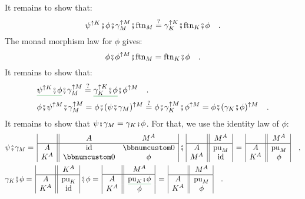 It remains to show that:
\[
\psi^{\uparrow K}\bef\phi\bef\gamma_{M}^{\uparrow M}\bef\text{ftn}_{M}\overset{?}{=}\gamma_{K}^{\uparrow K}\bef\text{ftn}_{K}\bef\phi\quad.
\]
The monad morphism law for $\phi$ gives:
\[
\phi\bef\phi^{\uparrow M}\bef\text{ftn}_{M}=\text{ftn}_{K}\bef\phi\quad.
\]
It remains to show that:
\begin{align*}
 & \gunderline{\psi^{\uparrow K}\bef\phi}\bef\gamma_{M}^{\uparrow M}\overset{?}{=}\gunderline{\gamma_{K}^{\uparrow K}\bef\phi}\bef\phi^{\uparrow M}\quad.\\
 & \phi\bef\psi^{\uparrow M}\bef\gamma_{M}^{\uparrow M}=\phi\bef(\psi\bef\gamma_{M})^{\uparrow M}\overset{?}{=}\phi\bef\gamma_{K}^{\uparrow M}\bef\phi^{\uparrow M}=\phi\bef(\gamma_{K}\bef\phi)^{\uparrow M}\quad.
\end{align*}
It remains to show that $\psi\bef\gamma_{M}=\gamma_{K}\bef\phi$.
For that, we use the identity law of $\phi$:
\begin{align*}
 & \psi\bef\gamma_{M}=\,\begin{array}{|c||cc|}
 & A & M^{A}\\
\hline A & \text{id} & \bbnum 0\\
K^{A} & \bbnum 0 & \phi
\end{array}\,\bef\,\begin{array}{|c||c|}
 & M^{A}\\
\hline A & \text{pu}_{M}\\
M^{A} & \text{id}
\end{array}\,=\,\begin{array}{|c||c|}
 & M^{A}\\
\hline A & \text{pu}_{M}\\
K^{A} & \phi
\end{array}\quad,\\
 & \gamma_{K}\bef\phi=\,\begin{array}{|c||c|}
 & K^{A}\\
\hline A & \text{pu}_{K}\\
K^{A} & \text{id}
\end{array}\,\bef\phi=\,\begin{array}{|c||c|}
 & M^{A}\\
\hline A & \gunderline{\text{pu}_{K}\bef\phi}\\
K^{A} & \phi
\end{array}\,=\,\begin{array}{|c||c|}
 & M^{A}\\
\hline A & \text{pu}_{M}\\
K^{A} & \phi
\end{array}\quad.
\end{align*}


